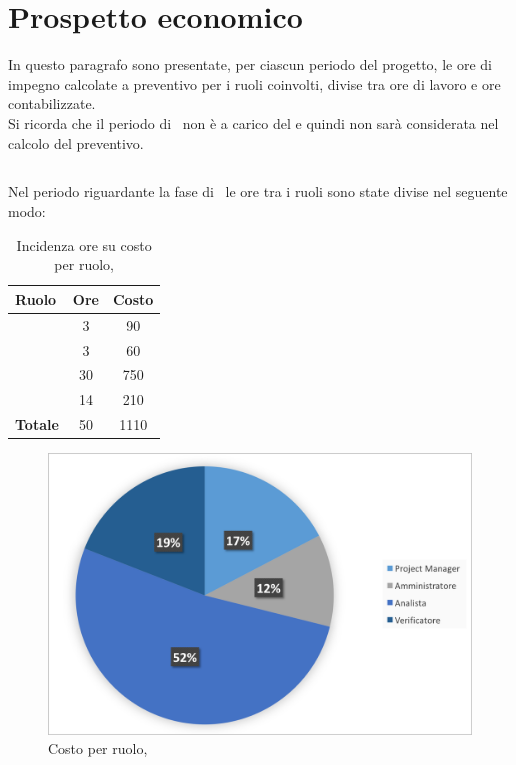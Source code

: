\newpage
\section{Prospetto economico}
In questo paragrafo sono presentate, per ciascun periodo del progetto, le ore di impegno calcolate a preventivo per i ruoli coinvolti, divise tra ore di lavoro e ore contabilizzate.\\
 Si ricorda che il periodo di \ARM\ non è a carico del  e quindi non sarà considerata nel calcolo del preventivo.
 
\subsection{\ARD}
Nel periodo riguardante la fase di \ARD\ le ore tra i ruoli sono state divise nel seguente modo:

\begin{table}[h]
	\begin{center}
		\begin{tabular}{|l|c|c|}
			\hline
			\textbf{Ruolo}	& \textbf{Ore} & \textbf{Costo} \\
			\hline
			\textit{\Pm} &	3	&	90\\
			\hline
			\textit{\Am}	&	3	&	 60	\\
			\hline
			\textit{\An}	&	30	&	 750	\\
			\hline
			\textit{\Ver}	 & 14	&	 210	\\
			\hline
			\textbf{Totale} &	 50	&	1110\\
			\hline
		\end{tabular}
	\end{center}
	\caption{Incidenza ore su costo per ruolo, \ARD}
\end{table}

\begin{figure}[H]
	\centering 
	\includegraphics[scale=0.7]{Immagini/GraficiTorteSezione6/ARD.png}
	\caption{Costo per ruolo, \ARD}
\end{figure}

